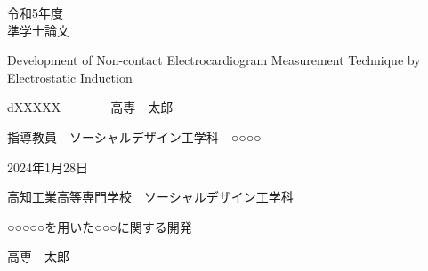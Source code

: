 \documentclass[12pt,uplatex]{jsreport}
\begin{document}
    \thispagestyle{empty}
    \vspace*{1em}
    \begin{center}
        {\Large 令和5年度\\準学士論文}

        \vspace{4em}

        {\huge {}}

        \vspace{3em}

        {\Large Development of Non-contact Electrocardiogram Measurement Technique by Electrostatic Induction}

        \vspace{17em}

        {\large dXXXXX　　　　高専　太郎}

        {\large 指導教員　ソーシャルデザイン工学科　○○○○}

        \vspace{5em}

        {\large 2024年1月28日}

        \vspace{2.5em}

        {\large 高知工業高等専門学校　ソーシャルデザイン工学科}
    \end{center}

    \newpage
    \vspace*{1.6em}
    \begin{center}
        {\large {}}

        \vspace{2.5em}

        {\large ○○○○○を用いた○○○に関する開発}

        \vspace{2.5em}

        {\large 高専　太郎}

        \vspace{2em}
    \end{center}
\end{document}
